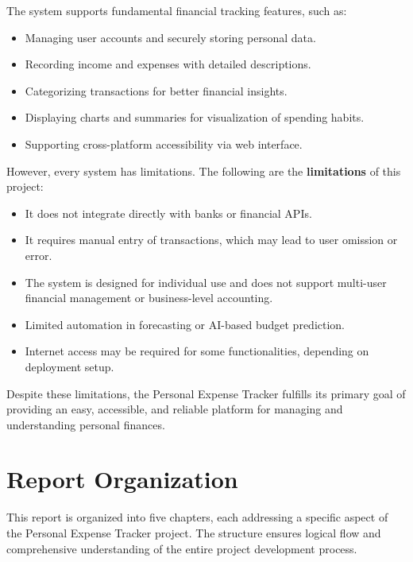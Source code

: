 \documentclass[12pt]{report}
\begin{document}
\noindent
The system supports fundamental financial tracking features, such as:
\begin{itemize}
    \item Managing user accounts and securely storing personal data.
    \item Recording income and expenses with detailed descriptions.
    \item Categorizing transactions for better financial insights.
    \item Displaying charts and summaries for visualization of spending habits.
    \item Supporting cross-platform accessibility via web interface.
\end{itemize}

\noindent
However, every system has limitations. The following are the \textbf{limitations} of this project:
\begin{itemize}
    \item It does not integrate directly with banks or financial APIs.
    \item It requires manual entry of transactions, which may lead to user omission or error.
    \item The system is designed for individual use and does not support multi-user financial management or business-level accounting.
    \item Limited automation in forecasting or AI-based budget prediction.
    \item Internet access may be required for some functionalities, depending on deployment setup.
\end{itemize}

Despite these limitations, the Personal Expense Tracker fulfills its primary goal of providing an easy, accessible, and reliable platform for managing and understanding personal finances.

\section{Report Organization}
\justifying
This report is organized into five chapters, each addressing a specific aspect of the Personal Expense Tracker project. The structure ensures logical flow and comprehensive understanding of the entire project development process.
\end{document}
